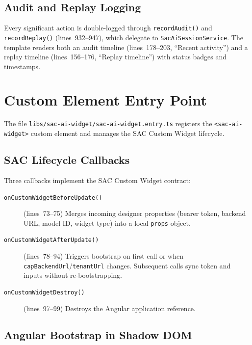 \documentclass[11pt]{article}
\begin{document}
\subsection{Audit and Replay Logging}

Every significant action is double-logged through \texttt{recordAudit()} and
\texttt{recordReplay()} (lines~932--947), which delegate to
\texttt{SacAiSessionService}. The template renders both an audit timeline
(lines~178--203, ``Recent activity'') and a replay timeline (lines~156--176,
``Replay timeline'') with status badges and timestamps.

\section{Custom Element Entry Point}
\label{sec:entry}

The file \texttt{libs/sac-ai-widget/sac-ai-widget.entry.ts} registers the
\texttt{<sac-ai-widget>} custom element and manages the SAC Custom Widget
lifecycle.

\subsection{SAC Lifecycle Callbacks}

Three callbacks implement the SAC Custom Widget contract:

\begin{description}
  \item[\texttt{onCustomWidgetBeforeUpdate()}] (lines~73--75) Merges incoming
    designer properties (bearer token, backend URL, model ID, widget type)
    into a local \texttt{props} object.
  \item[\texttt{onCustomWidgetAfterUpdate()}] (lines~78--94) Triggers
    bootstrap on first call or when \texttt{capBackendUrl}/\texttt{tenantUrl}
    changes. Subsequent calls sync token and inputs without re-bootstrapping.
  \item[\texttt{onCustomWidgetDestroy()}] (lines~97--99) Destroys the Angular
    application reference.
\end{description}

\subsection{Angular Bootstrap in Shadow DOM}
\end{document}
